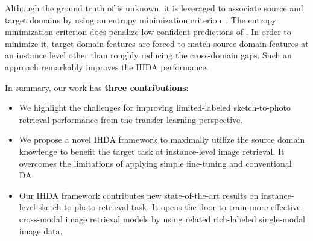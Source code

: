 \documentclass[journal]{IEEEtran}
\begin{document}
Although the ground truth of  is unknown, it is leveraged to associate source and target domains by using an entropy minimization criterion~\cite{luo2017label}. The entropy minimization criterion does penalize low-confident predictions of . In order to minimize it, target domain features are forced to match source domain features at an instance level other than roughly reducing the cross-domain gaps. Such an approach remarkably improves the IHDA performance. 

In summary, our work has \textbf{three contributions}:

\begin{itemize}
\item We highlight the challenges for improving limited-labeled sketch-to-photo retrieval performance from the transfer learning perspective.
\item We propose a novel IHDA framework to maximally utilize the source domain knowledge to benefit the target task at instance-level image retrieval. It overcomes the limitations of applying simple fine-tuning and conventional DA.
\item Our IHDA framework contributes new state-of-the-art results on instance-level sketch-to-photo retrieval task. It opens the door to train more effective cross-modal image retrieval models by using related rich-labeled single-modal image data. 
\end{itemize} 


\tabcolsep=4pt
\begin{table}[!ht]
\centering
\caption{Summary of Notations.}
\label{tab:notations}
\end{table}
\end{document}
